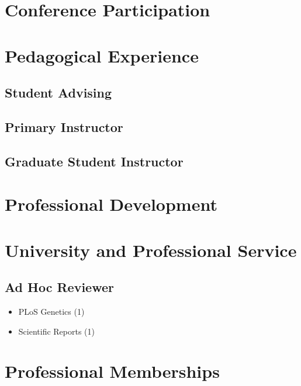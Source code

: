 \documentclass[11pt, a4paper]{awesome-cv}
\providecommand{\tightlist}{%
	\setlength{\itemsep}{0pt}\setlength{\parskip}{0pt}}
\begin{document}
\hypertarget{conference-participation}{%
\section{Conference Participation}\label{conference-participation}}

\begingroup
\setlength{\parindent}{-0.5in}
\setlength{\leftskip}{0.5in}

\endgroup

\hypertarget{pedagogical-experience}{%
\section{Pedagogical Experience}\label{pedagogical-experience}}

\hypertarget{student-advising}{%
\subsection{Student Advising}\label{student-advising}}

\hypertarget{primary-instructor}{%
\subsection{Primary Instructor}\label{primary-instructor}}

\hypertarget{graduate-student-instructor}{%
\subsection{Graduate Student
Instructor}\label{graduate-student-instructor}}

\hypertarget{professional-development}{%
\section{Professional Development}\label{professional-development}}

\hypertarget{university-and-professional-service}{%
\section{University and Professional
Service}\label{university-and-professional-service}}

\hypertarget{ad-hoc-reviewer}{%
\subsection{Ad Hoc Reviewer}\label{ad-hoc-reviewer}}

\begin{itemize}
\tightlist
\item
  PLoS Genetics (1)
\item
  Scientific Reports (1)
\end{itemize}

\hypertarget{professional-memberships}{%
\section{Professional Memberships}\label{professional-memberships}}
\end{document}
